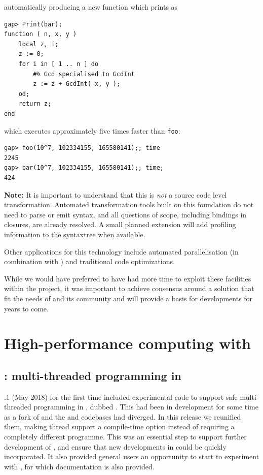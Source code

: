 \documentclass{deliverablereport}
\begin{document}
automatically producing a new function which prints as

\begin{verbatim}
gap> Print(bar);
function ( n, x, y )
    local z, i;
    z := 0;
    for i in [ 1 .. n ] do
        #% Gcd specialised to GcdInt
        z := z + GcdInt( x, y );
    od;
    return z;
end
\end{verbatim}

which executes approximately five times faster than \verb|foo|:
\begin{verbatim}
gap> foo(10^7, 102334155, 165580141);; time
2245
gap> bar(10^7, 102334155, 165580141);; time;
424
\end{verbatim}

\textbf{Note:} It is important to understand that this is \emph{not} a
source code level transformation. Automated transformation tools built
on this foundation do
not need to parse or emit \GAP syntax, and all questions of scope,
including bindings in closures, are already resolved. A small planned
extension will add profiling information to the syntaxtree when available.

Other applications for this technology include automated
parallelisation (in combination with \HPCGAP) and traditional code optimizations.

While we would have preferred to have had more time to exploit these
facilities within the project, it was important to achieve consensus
around a solution that fit the needs of \GAP and its community and
will provide a basis for developments for years to come.

\section{High-performance computing with \GAP}\label{hpc}

\subsection{\HPCGAP: multi-threaded programming in \GAP}\label{hpc-gap}

.1 (May 2018) for the first time included experimental code to 
support safe multi-threaded programming in \GAP, dubbed \HPCGAP. This
had been in development for some time as a fork of \GAP and the \HPCGAP and \GAP
codebases had diverged. In this release we reunified them,
making thread support a compile-time option instead of requiring a completely
different programme. This was an essential step to support further development of 
\HPCGAP, and ensure that new developments in \GAP could be quickly
incorporated. It also provided general \GAP users an opportunity to start to experiment 
with \HPCGAP, for which documentation is also provided.
\end{document}
